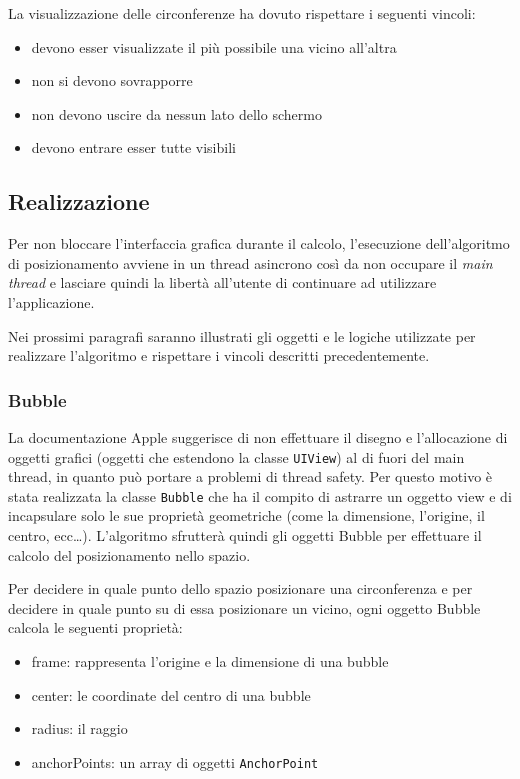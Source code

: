 La visualizzazione delle circonferenze ha dovuto rispettare i seguenti vincoli:

\begin{itemize}
 \item  devono esser visualizzate il più possibile una vicino all'altra
 \item  non si devono sovrapporre
 \item  non  devono uscire da nessun lato dello schermo 
 \item 	devono entrare esser tutte visibili
\end{itemize}

\subsection{Realizzazione}

Per non bloccare l'interfaccia grafica durante il calcolo, l'esecuzione dell'algoritmo di posizionamento avviene in un thread asincrono così da non occupare il \emph{main thread} e lasciare quindi la libertà all'utente di continuare ad utilizzare l'applicazione.

Nei prossimi paragrafi saranno illustrati gli oggetti e le logiche utilizzate per realizzare l'algoritmo e rispettare i vincoli descritti precedentemente.

\subsubsection{Bubble}

La documentazione Apple suggerisce di non effettuare il disegno e l'allocazione di oggetti grafici (oggetti che estendono la classe \texttt{UIView}) al di fuori del main thread, in quanto può portare a problemi di thread safety. Per questo motivo è stata realizzata la classe \texttt{Bubble} che ha il compito di astrarre un oggetto view e di incapsulare solo le sue proprietà geometriche (come la dimensione, l'origine, il centro, ecc\dots). L'algoritmo sfrutterà quindi gli oggetti Bubble per effettuare il calcolo del posizionamento nello spazio.

Per decidere in quale punto dello spazio posizionare una circonferenza e per decidere in quale punto su di essa posizionare un vicino, ogni oggetto Bubble calcola le seguenti proprietà:
\begin{itemize}
 \item frame: rappresenta l'origine e la dimensione di una bubble
 \item center: le coordinate del centro di una bubble
 \item radius: il raggio
 \item anchorPoints: un array di oggetti \texttt{AnchorPoint}
\end{itemize}

